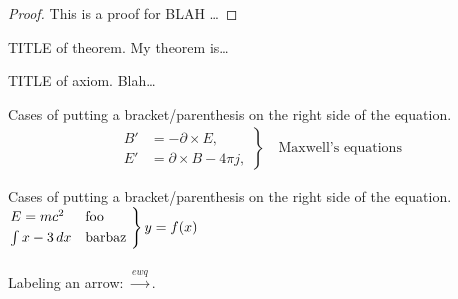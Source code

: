 \begin{proof}
This is a proof for BLAH \dots
\end{proof}




\begin{theorem}{TITLE of theorem.}
My theorem is\dots
\end{theorem}



\begin{axiom}{TITLE of axiom.}
Blah\dots
\end{axiom}



Cases of putting a bracket/parenthesis on the right side of the equation.
\begin{gather*}
	\left.\begin{aligned}
	B'&=-\partial \times E,\\
	E'&=\partial \times B - 4\pi j,
	\end{aligned}
	\right\}
	\quad\text{Maxwell's equations}
\end{gather*}


Cases of putting a bracket/parenthesis on the right side of the equation.\\
$\begin{rcases*}
	E = m c^2 & foo \\
	\int x-3\, dx & barbaz
\end{rcases*} y=f(x)$
\ \\
\ \\

Labeling an arrow: $\xrightarrow{ewq}$. \\






